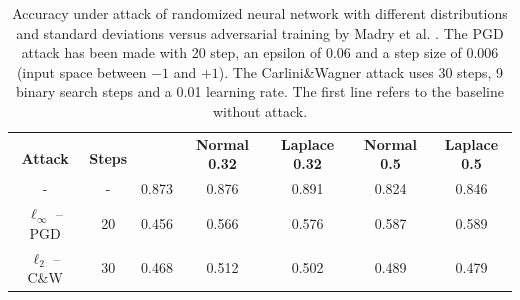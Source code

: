 
\begin{table}[t]
  \caption{Accuracy under attack of randomized neural network with different distributions and standard deviations versus adversarial training by Madry et al. \citep{madry2017towards}. The PGD attack has been made with 20 step, an epsilon of 0.06 and a step size of 0.006 (input space between $-1$ and $+1$). The Carlini\&Wagner attack uses 30 steps, 9 binary search steps and a 0.01 learning rate. The first line refers to the baseline without attack.}
  \label{Results}
  \centering
  \begin{tabular}{ccccccc}
    \toprule
      & & \multirow{2}[0]{*}{\citep{madry2017towards}} & \multirow{2}[0]{*}{\textbf{Normal 0.32}} & \multirow{2}[0]{*}{\textbf{Laplace 0.32}} & \multirow{2}[0]{*}{\textbf{Normal 0.5}} & \multirow{2}[0]{*}{\textbf{Laplace 0.5}} \\
     \textbf{Attack} & \textbf{Steps} & & & \\
    \midrule
    -  & - & 0.873 & 0.876 & 0.891 & 0.824 & 0.846 \\ 
    $\ell_\infty$ -- PGD & 20 & 0.456 & 0.566 & 0.576 & 0.587 & 0.589 \\
    $\ell_2$ -- C\&W & 30 & 0.468 & 0.512 & 0.502 & 0.489 & 0.479 \\
    \bottomrule
  \end{tabular}
  \label{table:madry_vs_random}
\end{table}



